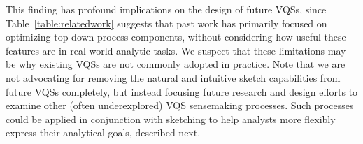  This finding has profound implications
 on the design of future VQSs, since Table~\ref{table:relatedwork}
 suggests that past work has primarily focused
 on optimizing top-down process components,
 without considering how useful these features
 are in real-world analytic tasks.
 We suspect that these limitations may be why existing VQSs are not commonly adopted in practice. Note that we are not advocating for removing the natural and intuitive sketch capabilities from future VQSs completely, but instead focusing future research and design efforts to examine other (often underexplored) VQS sensemaking processes. Such processes could be applied in conjunction with sketching to help analysts more flexibly express their analytical goals, described next.

 
